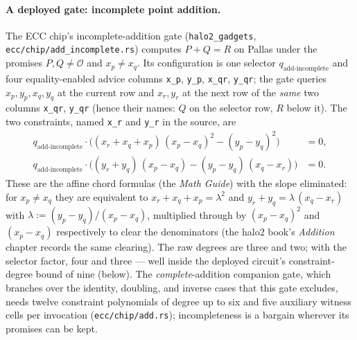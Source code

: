 \documentclass[11pt,a4paper]{article}
\theoremstyle{definition}
\begin{document}
\paragraph{A deployed gate: incomplete point addition.}
The ECC chip's incomplete-addition gate (\texttt{halo2\_gadgets},
\texttt{ecc/chip/add\_incomplete.rs}) computes $P + Q = R$ on Pallas under
the promises $P, Q \neq \mathcal{O}$ and $x_p \neq x_q$. Its configuration
is one selector $q_{\text{add-incomplete}}$ and four equality-enabled advice
columns \texttt{x\_p}, \texttt{y\_p}, \texttt{x\_qr}, \texttt{y\_qr}; the
gate queries $x_p, y_p, x_q, y_q$ at the current row and $x_r, y_r$ at the
next row of the \emph{same} two columns \texttt{x\_qr}, \texttt{y\_qr}
(hence their names: $Q$ on the selector row, $R$ below it). The two
constraints, named \texttt{x\_r} and \texttt{y\_r} in the source, are
\begin{align}
q_{\text{add-incomplete}} \cdot
  \bigl( (x_r + x_q + x_p)\,(x_p - x_q)^2 - (y_p - y_q)^2 \bigr) &= 0,
  \label{eq:add-inc-xr}\\
q_{\text{add-incomplete}} \cdot
  \bigl( (y_r + y_q)\,(x_p - x_q) - (y_p - y_q)\,(x_q - x_r) \bigr) &= 0.
  \label{eq:add-inc-yr}
\end{align}
These are the affine chord formulas (the \emph{Math Guide}) with the slope
eliminated: for $x_p \neq x_q$ they are equivalent to
$x_r + x_q + x_p = \lambda^2$ and $y_r + y_q = \lambda\,(x_q - x_r)$ with
$\lambda := (y_p - y_q)/(x_p - x_q)$, multiplied through by
$(x_p - x_q)^2$ and $(x_p - x_q)$ respectively to clear the denominators
(the halo2 book's \emph{Addition} chapter records the same clearing). The
raw degrees are three and two; with the selector factor, four and three ---
well inside the deployed circuit's constraint-degree bound of nine (below).
The \emph{complete}-addition companion gate, which branches over the
identity, doubling, and inverse cases that this gate excludes, needs twelve
constraint polynomials of degree up to six and five auxiliary witness cells
per invocation (\texttt{ecc/chip/add.rs}); incompleteness is a bargain
wherever its promises can be kept.
\end{document}
